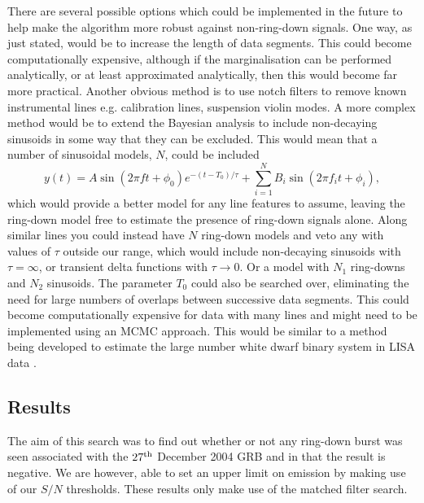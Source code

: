 There are several possible options which could be implemented in the future to help make the
algorithm more robust against non-ring-down signals. One way, as just stated, would be to increase
the length of data segments. This could become computationally expensive, although if the
marginalisation can be performed analytically, or at least approximated analytically, then this
would become far more practical. Another obvious method is to use notch filters to remove known
instrumental lines e.g. calibration lines, suspension violin modes. A more complex method would be
to extend the Bayesian analysis to include non-decaying sinusoids in some way that they can be
excluded. This would mean that a number of sinusoidal models, $N$, could be included
\begin{equation}
y(t) = A\sin{(2\pi{}ft+\phi_0)}e^{-(t-T_0)/\tau} + \sum_{i=1}^N B_i\sin{(2\pi{}f_it+\phi_i)}, 
\end{equation}
which would provide a better model for any line features to assume, leaving the ring-down model free
to estimate the presence of ring-down signals alone. Along similar lines you could instead have $N$
ring-down models and veto any with values of $\tau$ outside our range, which would include
non-decaying sinusoids with $\tau = \infty$, or transient delta functions with $\tau \to 0$. Or a
model with $N_1$ ring-downs and $N_2$ sinusoids. The parameter $T_0$ could also be searched
over, eliminating the need for large numbers of overlaps between successive data segments. This
could become computationally expensive for data with many lines and might need to be implemented
using an MCMC approach. This would be similar to a method being developed to estimate the large
number white dwarf binary system in LISA data \cite{Umstatter:2005}.

\subsection{Results}
The aim of this search was to find out whether or not any ring-down \gw burst was seen associated
with the $27^{\rm th}$ December 2004 GRB and in that the result is negative. We are however, able to
set an upper limit on \gw emission by making use of our $S/N$ thresholds. These results only make
use of the matched filter search.

